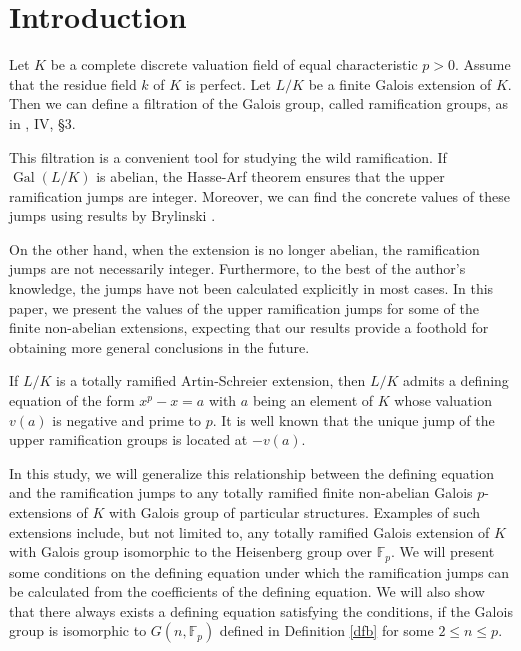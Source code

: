 \documentclass[10pt,a4paper]{amsart}
\numberwithin{equation}{section}
\newcommand{\Gal}{\operatorname{Gal}}
\theoremstyle{plain}
\theoremstyle{definition}
\begin{document}
\section{Introduction}

Let $K$ be a complete discrete valuation field of equal characteristic $p>0$. Assume that the residue field $k$ of $K$ is perfect. Let $L/K$ be a finite Galois extension of $K$. Then we can define a filtration of the Galois group, called ramification groups, as in \cite{Se}, IV, \S 3. 

This filtration is a convenient tool for studying the wild ramification. If $\Gal(L/K)$ is abelian, the Hasse-Arf theorem ensures that the upper ramification jumps are integer. Moreover, we can find the concrete values of these jumps using results by Brylinski \cite{Br}. 

On the other hand, when the extension is no longer abelian, the ramification jumps are not necessarily integer. Furthermore, to the best of the author's knowledge, the jumps have not been calculated explicitly in most cases. In this paper, we present the values of the upper ramification jumps for some of the finite non-abelian extensions, expecting that our results provide a foothold for obtaining more general conclusions in the future.

If $L/K$ is a totally ramified Artin-Schreier extension, then $L/K$ admits a defining equation of the form $x^p-x=a$ with $a$ being an element of $K$ whose valuation $v(a)$ is negative and prime to $p$. It is well known that the unique jump of the upper ramification groups is located at $-v(a)$.

In this study, we will generalize this relationship between the defining equation and the ramification jumps to any totally ramified finite non-abelian Galois $p$-extensions of $K$ with Galois group of particular structures. Examples of such extensions include, but not limited to, any totally ramified Galois extension of $K$ with Galois group isomorphic to the Heisenberg group over $\mathbb{F}_p$. We will present some conditions on the defining equation under which the ramification jumps can be calculated from the coefficients of the defining equation. We will also show that there always exists a defining equation satisfying the conditions, if the Galois group is isomorphic to $G(n,\mathbb{F}_p)$ defined in Definition \ref{dfb} for some $2\leq n\leq p$.
\end{document}
